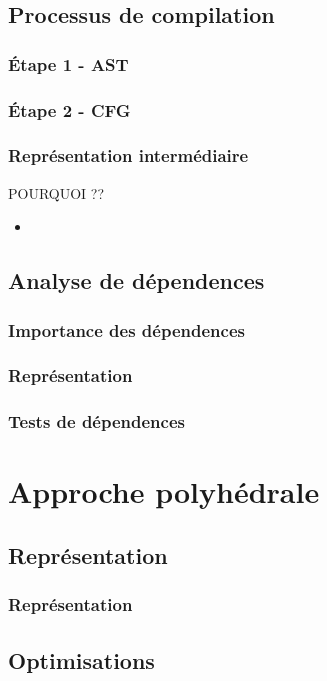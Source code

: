 \documentclass{beamer}
\begin{document}
\subsection{Processus de compilation}
\begin{frame}
\frametitle{Étape 1 - AST}

\end{frame}

\begin{frame}
\frametitle{Étape 2 - CFG}

\end{frame}

\begin{frame}
\frametitle{Représentation intermédiaire}
POURQUOI ??
\begin{itemize}
\item 
\end{itemize}
\end{frame}

\subsection{Analyse de dépendences}
\begin{frame}
\frametitle{Importance des dépendences}

\end{frame}

\begin{frame}
\frametitle{Représentation}

\end{frame}

\begin{frame}
\frametitle{Tests de dépendences}

\end{frame}

\section{Approche polyhédrale}
\subsection{Représentation}
\begin{frame}
\frametitle{Représentation}

\end{frame}

\subsection{Optimisations}
\end{document}
